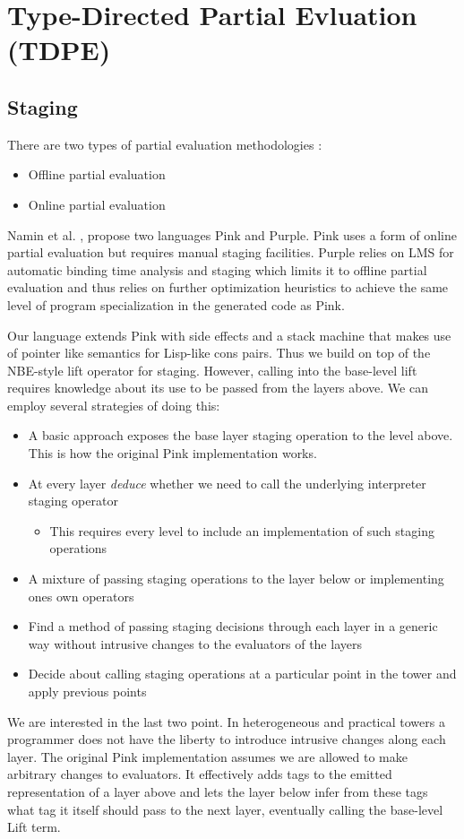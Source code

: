 \documentclass[fleqn]{article}
\theoremstyle{definition}
\begin{document}
\section{Type-Directed Partial Evluation (TDPE)}
\cite{grobauer2001second}

\subsection{Staging}
There are two types of partial evaluation methodologies \cite{jones1993partial}:
\begin{itemize}
	\item Offline partial evaluation
	\item Online partial evaluation \cite{cook2011tutorial}
\end{itemize}
Namin et al. \cite{amin2017collapsing}, propose two languages Pink and Purple. Pink uses a form of online partial evaluation but requires manual staging facilities. Purple relies on LMS for automatic binding time analysis and staging
which limits it to offline partial evaluation and thus relies on further optimization heuristics to achieve the same level of program specialization in the generated code as Pink.

Our language extends Pink with side effects and a stack machine that makes use of pointer like semantics for Lisp-like cons pairs. Thus we build on top of the NBE-style lift operator for staging. However, calling into
the base-level lift requires knowledge about its use to be passed from the layers above. We can employ several strategies of doing this:
\begin{itemize}
	\item A basic approach exposes the base layer staging operation to the level above. This is how the original Pink implementation works.
	\item At every layer \textit{deduce} whether we need to call the underlying interpreter staging operator
	\begin{itemize}
		\item This requires every level to include an implementation of such staging operations
	\end{itemize}
	\item A mixture of passing staging operations to the layer below or implementing ones own operators
	\item Find a method of passing staging decisions through each layer in a generic way without intrusive changes to the evaluators of the layers
	\item Decide about calling staging operations at a particular point in the tower and apply previous points
\end{itemize}
We are interested in the last two point. In heterogeneous and practical towers a programmer does not have the liberty to introduce intrusive changes along each layer.
The original Pink implementation assumes we are allowed to make arbitrary changes to evaluators. It effectively adds tags to the emitted representation of a layer above and lets the layer below infer from these tags
what tag it itself should pass to the next layer, eventually calling the base-level Lift term.
\end{document}
